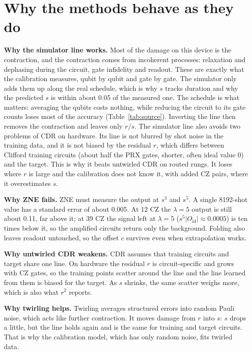 \documentclass[aps,pra,twocolumn,superscriptaddress,nofootinbib,10pt]{revtex4-2}
\newcommand{\Oid}{O_{\mathrm{id}}}
\begin{document}
\section{Why the methods behave as they do}

\textbf{Why the simulator line works.} Most of the damage on this device is the contraction,
and the contraction comes from incoherent processes: relaxation and dephasing during the
circuit, gate infidelity and readout. These are exactly what the calibration measures, qubit by
qubit and gate by gate. The simulator only adds them up along the real schedule, which is why
$s$ tracks duration and why the predicted $s$ is within about 0.05 of the measured one. The
schedule is what matters: averaging the qubits costs nothing, while reducing the circuit to its gate
counts loses most of the accuracy (Table~\ref{tab:source}).
Inverting the line then removes the contraction and leaves only $r/s$. The simulator line also
avoids two problems of CDR on hardware. Its line is not blurred by shot noise in the training
data, and it is not biased by the residual $r$, which differs between Clifford training circuits
(about half the PRX gates, shorter, often ideal value 0) and the target. This is why it beats
untwirled CDR on routed rungs. It loses where $r$ is large and the calibration does not know it,
with added CZ pairs, where it overestimates $s$.

\textbf{Why ZNE fails.} ZNE must measure the output at $s^3$ and $s^5$. A single 8192-shot value
has a standard error of about 0.005. At 12 CZ the $\lambda=5$ output is still about 0.11, far
above it; at 39 CZ the signal left at $\lambda=5$ ($s^5|\Oid|\approx0.0005$) is ten times below
it, so the amplified circuits return only the background. Folding also leaves readout untouched,
so the offset $c$ survives even when extrapolation works.

\textbf{Why untwirled CDR weakens.} CDR assumes that training circuits and target share one line.
On hardware the residual $r$ is circuit-specific and grows with CZ gates, so the training points
scatter around the line and the line learned from them is biased for the target. As $s$ shrinks,
the same scatter weighs more, which is also what $r^2$ reports.

\textbf{Why twirling helps.} Twirling averages structured errors into random Pauli noise, which
acts like further contraction. It moves damage from $r$ into $s$: $s$ drops a little, but the
line holds again and is the same for training and target circuits. That is why the calibration
model, which has only random noise, fits twirled data.
\end{document}
